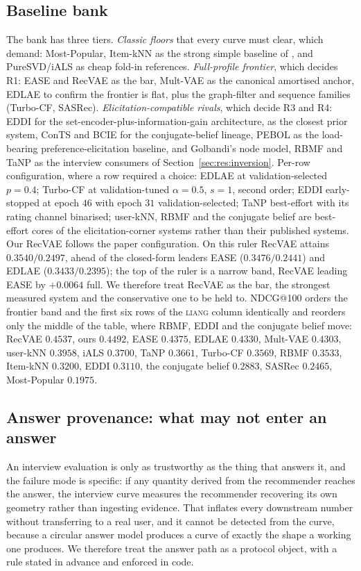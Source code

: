 \documentclass[manuscript,screen]{acmart}
\begin{document}
\subsection{Baseline bank}
The bank has three tiers. \emph{Classic floors} that every curve must clear, which \citet{dacrema2019progress} demand: Most-Popular, Item-kNN as the strong simple baseline of \citet{cremonesi2010performance}, and PureSVD/iALS as cheap fold-in references. \emph{Full-profile frontier}, which decides R1: EASE and RecVAE as the bar, Mult-VAE as the canonical amortised anchor, EDLAE to confirm the frontier is flat, plus the graph-filter and sequence families (Turbo-CF, SASRec). \emph{Elicitation-compatible rivals}, which decide R3 and R4: EDDI for the set-encoder-plus-information-gain architecture, \citet{biyik2023soft} as the closest prior system, ConTS and BCIE for the conjugate-belief lineage, PEBOL as the load-bearing preference-elicitation baseline, and Golbandi's node model, RBMF and TaNP as the interview consumers of Section~\ref{sec:res:inversion}. Per-row configuration, where a row required a choice: EDLAE at validation-selected $p{=}0.4$; Turbo-CF at validation-tuned $\alpha{=}0.5$, $s{=}1$, second order; EDDI early-stopped at epoch $46$ with epoch $31$ validation-selected; TaNP best-effort with its rating channel binarised; user-kNN, RBMF and the conjugate belief are best-effort cores of the elicitation-corner systems rather than their published systems. Our RecVAE follows the paper configuration. On this ruler RecVAE attains $0.3540/0.2497$, ahead of the closed-form leaders EASE ($0.3476/0.2441$) and EDLAE ($0.3433/0.2395$); the top of the ruler is a narrow band, RecVAE leading EASE by $+0.0064$ full. We therefore treat RecVAE as the bar, the strongest measured system and the conservative one to be held to. NDCG@100 orders the frontier band and the first six rows of the \textsc{liang} column identically and reorders only the middle of the table, where RBMF, EDDI and the conjugate belief move: RecVAE $0.4537$, ours $0.4492$, EASE $0.4375$, EDLAE $0.4330$, Mult-VAE $0.4303$, user-kNN $0.3958$, iALS $0.3700$, TaNP $0.3661$, Turbo-CF $0.3569$, RBMF $0.3533$, Item-kNN $0.3200$, EDDI $0.3110$, the conjugate belief $0.2883$, SASRec $0.2465$, Most-Popular $0.1975$.

\subsection{Answer provenance: what may not enter an answer}\label{sec:provenance}
An interview evaluation is only as trustworthy as the thing that answers it, and the failure mode is specific: if any quantity derived from the recommender reaches the answer, the interview curve measures the recommender recovering its own geometry rather than ingesting evidence. That inflates every downstream number without transferring to a real user, and it cannot be detected from the curve, because a circular answer model produces a curve of exactly the shape a working one produces. We therefore treat the answer path as a protocol object, with a rule stated in advance and enforced in code.
\end{document}
